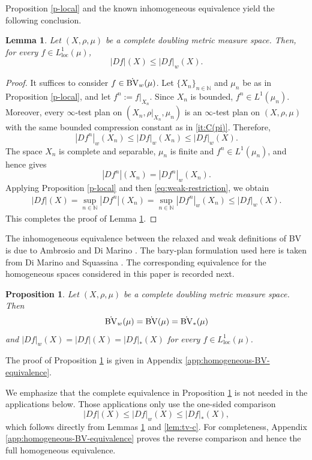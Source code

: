 \documentclass[11pt]{amsart}
\newtheorem{proposition}[theorem]{Proposition}
\newtheorem{lemma}[theorem]{Lemma}
\theoremstyle{definition}
\theoremstyle{remark}
\numberwithin{equation}{section}
\begin{document}
Proposition \ref{p-local} and the
known inhomogeneous equivalence
yield the following conclusion.

\begin{lemma}\label{lem:tv-w-lower}
Let $(X,\rho,\mu)$ be a complete doubling metric measure space. Then, for
every $f\in L_{\mathrm{loc}}^1(\mu)$,
$$
|Df|(X)\le |Df|_w(X).
$$
\end{lemma}

\begin{proof}
It suffices to consider $f\in\dot{\rm BV}_w(\mu)$. Let
$\{X_n\}_{n\in\mathbb N}$ and $\mu_n$ be as in Proposition
\ref{p-local}, and let $f^n:=f|_{X_n}$. Since $X_n$ is bounded,
$f^n\in L^1(\mu_n)$. Moreover, every $\infty$-test plan on
$(X_n,\rho|_{X_n},\mu_n)$ is an $\infty$-test plan on $(X,\rho,\mu)$ with
the same bounded compression constant as in \eqref{it:C(pi)}. Therefore,
\begin{equation}\label{eq:weak-restriction}
|Df^n|_{w}(X_n)
\le |Df|_{w}(X_n)
\le |Df|_{w}(X).
\end{equation}
The space $X_n$ is complete and separable, $\mu_n$ is finite and $f^n\in L^1(\mu_n)$, and
hence
\cite[Theorem 1.1]{AD:14} gives
$$
|Df^n|(X_n)=|Df^n|_{w}(X_n).
$$
Applying Proposition \ref{p-local} and then \eqref{eq:weak-restriction}, we
obtain
\begin{align*}
|Df|(X)
=\sup_{n\in\mathbb N}|Df^n|(X_n)
=\sup_{n\in\mathbb N}|Df^n|_{w}(X_n)
\le |Df|_{w}(X).
\end{align*}
This completes the proof of Lemma \ref{lem:tv-w-lower}.
\end{proof}

The inhomogeneous equivalence between the relaxed and weak definitions of
BV is due to Ambrosio and Di Marino \cite[Theorem 1.1]{AD:14}.  The
bary-plan formulation used here is taken from Di Marino and Squassina
\cite[Definition 2.5]{DMS}.  The corresponding equivalence for the
homogeneous spaces considered in this paper is recorded next.

\begin{proposition}\label{p-eq}
Let $(X,\rho,\mu)$ be a complete doubling metric measure space. Then
$$
\dot{\rm BV}_w(\mu)=\dot{\rm BV}(\mu)=\dot{\rm BV}_*(\mu)
$$
and $|Df|_w(X)=|Df|(X)=|Df|_*(X)$ for every $f\in L_{\mathrm{loc}}^1(\mu)$.
\end{proposition}

The proof of Proposition \ref{p-eq} is given in Appendix \ref{app:homogeneous-BV-equivalence}.

We emphasize that the complete equivalence in Proposition \ref{p-eq} is
not needed in the applications below.  Those applications only use the
one-sided comparison
\begin{equation}\label{eq:BV-one-sided-comparison}
  |Df|(X)\leq |Df|_w(X)\leq |Df|_*(X),
\end{equation}
which follows directly from Lemmas \ref{lem:tv-w-lower} and
\ref{lem:tv-c}.  For completeness, Appendix
\ref{app:homogeneous-BV-equivalence} proves the reverse comparison and
hence the full homogeneous equivalence.
\end{document}
